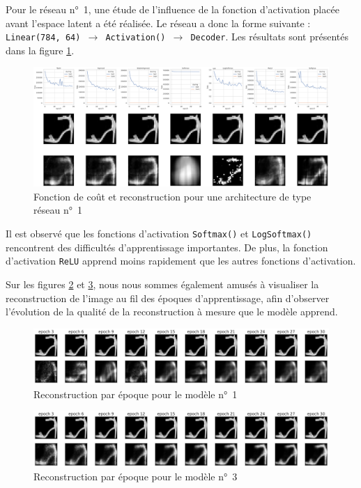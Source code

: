 \documentclass{article}
\begin{document}
Pour le réseau n°~1, une étude de l'influence de la fonction d'activation placée avant l'espace latent a été réalisée. Le réseau a donc la forme suivante : \texttt{Linear(784, 64) $\rightarrow$ Activation() $\rightarrow$ Decoder}. Les résultats sont présentés dans la figure \ref{fig:accfct}. 

\begin{figure}[htbp]
    \centering
    \includegraphics*[width=\textwidth]{encoder_decoder_middle_func_simple_net.pdf}
    \caption{Fonction de coût et reconstruction pour une architecture de type réseau n°~1}
    \label{fig:accfct}
\end{figure}

Il est observé que les fonctions d'activation \texttt{Softmax()} et \texttt{LogSoftmax()} rencontrent des difficultés d'apprentissage importantes. De plus, la fonction d'activation \texttt{ReLU} apprend moins rapidement que les autres fonctions d'activation.

Sur les figures \ref{fig:perEpochSimple} et \ref{fig:perEpochBig}, nous nous sommes également amusés à visualiser la reconstruction de l'image au fil des époques d'apprentissage, afin d'observer l'évolution de la qualité de la reconstruction à mesure que le modèle apprend.

\begin{figure}[htbp]
    \centering
    \includegraphics*[width=\textwidth]{reconstruction_per_epoch_simple_model.pdf}
    \caption{Reconstruction par époque pour le modèle n°~1}
    \label{fig:perEpochSimple}
\end{figure}

\begin{figure}[htbp]
    \centering
    \includegraphics*[width=\textwidth]{reconstruction_per_epoch_big_model.pdf}
    \caption{Reconstruction par époque pour le modèle n°~3}
    \label{fig:perEpochBig}
\end{figure}
\end{document}
